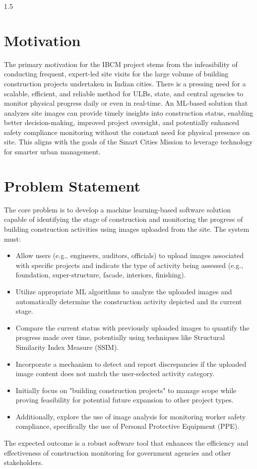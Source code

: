 \documentclass[12pt,a4paper]{report}
\begin{document}
\begin{spacing}{1.5}
    \section{Motivation}
    The primary motivation for the IBCM project stems from the infeasibility of conducting frequent, expert-led site visits for the large volume of building construction projects undertaken in Indian cities. There is a pressing need for a scalable, efficient, and reliable method for ULBs, state, and central agencies to monitor physical progress daily or even in real-time. An ML-based solution that analyzes site images can provide timely insights into construction status, enabling better decision-making, improved project oversight, and potentially enhanced safety compliance monitoring without the constant need for physical presence on site. This aligns with the goals of the Smart Cities Mission to leverage technology for smarter urban management.

    \section{Problem Statement}
    The core problem is to develop a machine learning-based software solution capable of identifying the stage of construction and monitoring the progress of building construction activities using images uploaded from the site. The system must:
    \begin{itemize}
        \item Allow users (e.g., engineers, auditors, officials) to upload images associated with specific projects and indicate the type of activity being assessed (e.g., foundation, super-structure, facade, interiors, finishing).
        \item Utilize appropriate ML algorithms to analyze the uploaded images and automatically determine the construction activity depicted and its current stage.
        \item Compare the current status with previously uploaded images to quantify the progress made over time, potentially using techniques like Structural Similarity Index Measure (SSIM).
        \item Incorporate a mechanism to detect and report discrepancies if the uploaded image content does not match the user-selected activity category.
        \item Initially focus on "building construction projects" to manage scope while proving feasibility for potential future expansion to other project types.
        \item Additionally, explore the use of image analysis for monitoring worker safety compliance, specifically the use of Personal Protective Equipment (PPE).
    \end{itemize}
    The expected outcome is a robust software tool that enhances the efficiency and effectiveness of construction monitoring for government agencies and other stakeholders.


\end{spacing}
\end{document}
